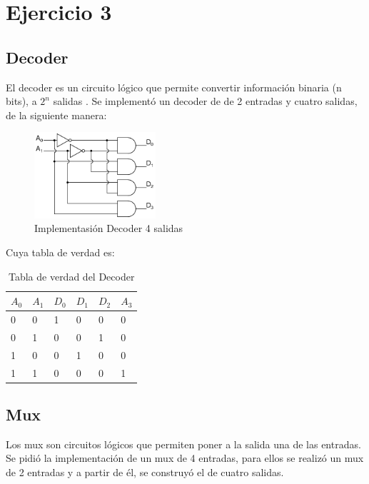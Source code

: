 \documentclass[../../../informe/src/main.tex]{subfiles}
\begin{document}
\section{Ejercicio 3}

\subsection{Decoder}
El decoder es un circuito lógico que permite convertir información binaria (n bits), a $2^{n}$ salidas .
Se implementó un decoder de  de 2 entradas y cuatro salidas, de la siguiente manera:
\begin{figure}[H]
\centering
\includegraphics[width=0.4\textwidth]{imagenes/decoder.png}
\caption{Implementasión Decoder 4 salidas} \label{fig=decoder}
\end{figure}


Cuya tabla de verdad es:

\begin{table}[h]
\begin{center}
\begin{tabular}{|l|l|l|l|l|l|}
\hline
$A_{0}$ & $A_{1} $ & $D_{0}$  &  $D_{1}$ & $D_{2}$ & $A_{3}$\\
\hline \hline
0 & 0 & 1 & 0 & 0 & 0 \\ \hline
0 & 1 & 0 & 0 & 1 & 0 \\ \hline
1 & 0 & 0 & 1 & 0 & 0 \\ \hline
1 & 1 & 0 & 0 & 0 & 1 \\ \hline

\end{tabular}
\caption{Tabla de verdad del Decoder} 
\label{tab=decTab}
\end{center}
\end{table}

\subsection{Mux}

Los mux son circuitos lógicos que permiten poner a la salida una de las entradas.
Se pidió la implementación de un mux de 4 entradas, para ellos se realizó un mux de 2 entradas y a partir de él, se construyó el de cuatro salidas.
\end{document}
